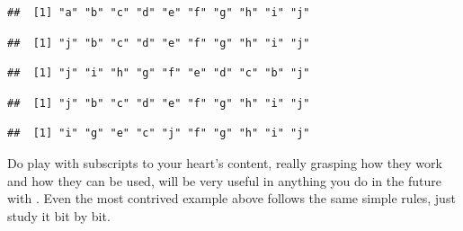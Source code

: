 \documentclass[krantz2]{krantz}\usepackage{knitr}%
\begin{document}
\begin{knitrout}\footnotesize
{}\color{fgcolor}\begin{kframe}
\begin{alltt}
 \hlkwb{<-} \hlstd{letters[}\hlopt{:}\hlstd{]}
\end{alltt}
\begin{verbatim}
##  [1] "a" "b" "c" "d" "e" "f" "g" "h" "i" "j"
\end{verbatim}
\begin{alltt}
\hlstd{a[}\hlstd{]} \hlkwb{<-} \hlstd{a[}\hlstd{]}
\end{alltt}
\begin{verbatim}
##  [1] "j" "b" "c" "d" "e" "f" "g" "h" "i" "j"
\end{verbatim}
\begin{alltt}
 \hlkwb{<-} \hlstd{a[}\hlopt{:}\hlstd{]}
\end{alltt}
\begin{verbatim}
##  [1] "j" "i" "h" "g" "f" "e" "d" "c" "b" "j"
\end{verbatim}
\begin{alltt}
\hlstd{a[}\hlopt{:}\hlstd{]} \hlkwb{<-} 
\end{alltt}
\begin{verbatim}
##  [1] "j" "b" "c" "d" "e" "f" "g" "h" "i" "j"
\end{verbatim}
\begin{alltt}
\hlstd{a[}\hlopt{:}\hlstd{]} \hlkwb{<-} \hlstd{a[}\hlstd{(}\hlstd{,}\hlstd{)]} 
\end{alltt}
\begin{verbatim}
##  [1] "i" "g" "e" "c" "j" "f" "g" "h" "i" "j"
\end{verbatim}
\end{kframe}
\end{knitrout}

\begin{playground}
Do play with subscripts to your heart's content, really grasping how they work and how they can be used, will be very useful in anything you do in the future with \Rlang. Even the most contrived example above follows the same simple rules, just study it bit by bit.
\end{playground}
\end{document}
